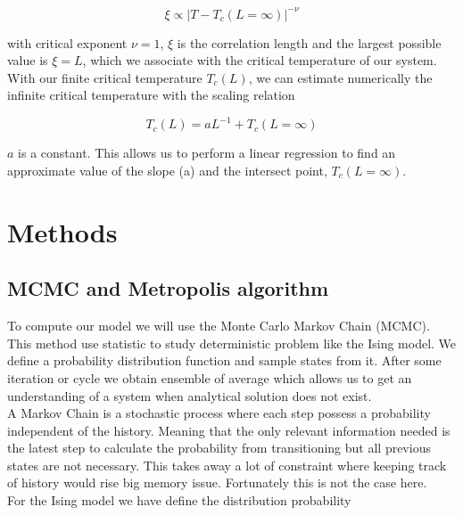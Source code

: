 \documentclass[english,notitlepage,reprint,nofootinbib]{revtex4-2}  %
\begin{document}
	\begin{equation}
		\xi \propto |T - T_c(L=\infty)|^{-\nu} \label{eq:critical exponent}
	\end{equation}

	with critical exponent $\nu=1$, $\xi$ is the correlation length and the largest possible
	value is $\xi=L$, which we associate with the critical temperature of our system. \\

	With our finite critical temperature $T_c(L)$, we can estimate numerically the infinite
	critical temperature with the scaling relation

	\begin{equation}
		T_c(L) = aL^{-1} + T_c(L=\infty) \label{eq:scaling relation}
	\end{equation}

	$a$ is a constant. This allows us to perform a linear regression to find an approximate value
	of the slope (a) and the intersect point, $T_c(L=\infty)$.
	
	
	\section{Methods}\label{sec:methods}
	\subsection{MCMC and Metropolis algorithm} \label{subsec:mcmc}
	To compute our model we will use the Monte Carlo Markov Chain (MCMC). This method use 
	statistic to study deterministic problem like the Ising model. We define a probability 
	distribution function and sample states from it. After some iteration or cycle we obtain
	ensemble of average which allows us to get an understanding of a system when analytical 
	solution does not exist. \\
	
	A Markov Chain is a stochastic process where each step possess a probability
	independent of the history. Meaning that the only relevant information needed is the 
	latest step to calculate the probability from transitioning but all previous states are
	not necessary. This takes away a lot of constraint where keeping track of history would
	rise big memory issue. Fortunately this is not the case here. \\
	
	For the Ising model we have define the distribution probability
	
\end{document}
